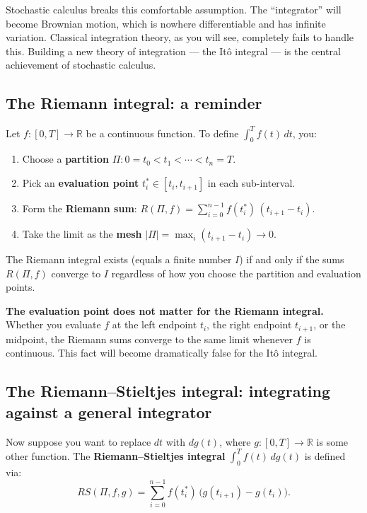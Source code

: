 \documentclass[11pt,a4paper]{article}
\theoremstyle{definition}
\theoremstyle{plain}
\theoremstyle{remark}
\newcommand{\R}{\mathbb{R}}
\newcommand{\abs}[1]{\left|#1\right|}
\begin{document}
Stochastic calculus breaks this comfortable assumption. The ``integrator'' will become Brownian motion, which is nowhere differentiable and has infinite variation. Classical integration theory, as you will see, completely fails to handle this. Building a new theory of integration — the Itô integral — is the central achievement of stochastic calculus.

\subsection{The Riemann integral: a reminder}

Let $f: [0,T] \to \R$ be a continuous function. To define $\int_0^T f(t)\,dt$, you:

\begin{enumerate}[label=\arabic*.]
  \item Choose a \textbf{partition} $\Pi: 0 = t_0 < t_1 < \cdots < t_n = T$.
  \item Pick an \textbf{evaluation point} $t_i^* \in [t_i, t_{i+1}]$ in each sub-interval.
  \item Form the \textbf{Riemann sum}: $R(\Pi, f) = \sum_{i=0}^{n-1} f(t_i^*)\,(t_{i+1} - t_i)$.
  \item Take the limit as the \textbf{mesh} $\abs{\Pi} = \max_i(t_{i+1} - t_i) \to 0$.
\end{enumerate}

The Riemann integral exists (equals a finite number $I$) if and only if the sums $R(\Pi, f)$ converge to $I$ regardless of how you choose the partition and evaluation points.

\begin{keyidea}
\textbf{The evaluation point does not matter for the Riemann integral.}
Whether you evaluate $f$ at the left endpoint $t_i$, the right endpoint $t_{i+1}$, or the midpoint, the Riemann sums converge to the same limit whenever $f$ is continuous. This fact will become dramatically false for the Itô integral.
\end{keyidea}

\subsection{The Riemann--Stieltjes integral: integrating against a general integrator}

Now suppose you want to replace $dt$ with $dg(t)$, where $g: [0,T] \to \R$ is some other function. The \textbf{Riemann--Stieltjes integral} $\int_0^T f(t)\,dg(t)$ is defined via:
\[
  RS(\Pi, f, g) = \sum_{i=0}^{n-1} f(t_i^*)\,\bigl(g(t_{i+1}) - g(t_i)\bigr).
\]
\end{document}
